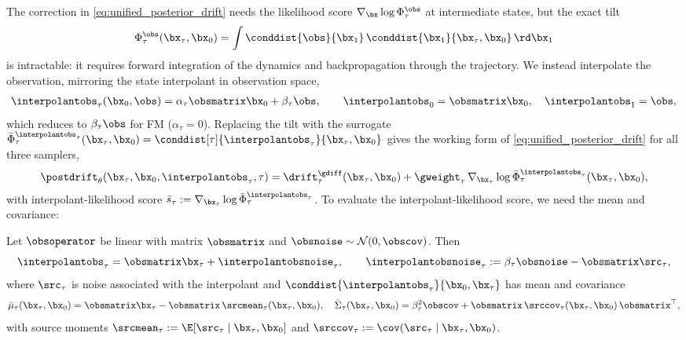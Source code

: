 The correction in \eqref{eq:unified_posterior_drift} needs the likelihood score $\nabla_{\bx}\log\Phi_\tau^{\obs}$ at intermediate states, but the exact tilt
\begin{align}\label{eq:phi_integral}
    \Phi_{\tau}^{\obs}(\bx_\tau, \bx_0)
    = \int \conddist{\obs}{\bx_1}\, \conddist{\bx_1}{\bx_\tau, \bx_0}\, \rd \bx_1
\end{align}
is intractable: it requires forward integration of the dynamics and backpropagation through the trajectory. We instead interpolate the observation, mirroring the state interpolant in observation space,
\begin{align} \label{eq:interpolated_observation}
    \interpolantobs_\tau(\bx_0, \obs) = \alpha_\tau \obsmatrix\bx_0 + \beta_\tau \obs,
    \qquad \interpolantobs_0 = \obsmatrix\bx_0,\quad \interpolantobs_1 = \obs,
\end{align}
which reduces to $\beta_\tau\obs$ for FM ($\alpha_\tau=0$). Replacing the tilt with the surrogate $\bar{\Phi}_{\tau}^{\interpolantobs_\tau}(\bx_\tau, \bx_0) = \conddist[\tau]{\interpolantobs_\tau}{\bx_\tau, \bx_0}$ gives the working form of \eqref{eq:unified_posterior_drift} for all three samplers,
\begin{align} \label{eq:interpolant_posterior_drift}
    \postdrift_\theta(\bx_{\tau}, \bx_0, \interpolantobs_\tau, \tau)
    =
    \drift^{\gdiff}_\tau(\bx_{\tau}, \bx_0)
    + \gweight_\tau\,
    \nabla_{\bx_\tau} \log\bar{\Phi}_{\tau}^{\interpolantobs_\tau}(\bx_\tau, \bx_0),
\end{align}
with interpolant-likelihood score $\bar s_\tau := \nabla_{\bx_\tau}\log\bar\Phi_\tau^{\interpolantobs_\tau}$. To evaluate the interpolant-likelihood score, we need the mean and covariance:
\begin{lemma}\label{lem:interpolated_likelihood}
Let $\obsoperator$ be linear with matrix $\obsmatrix$ and $\obsnoise \sim \mathcal{N}(0,\obscov)$. Then
\begin{equation}\label{eq:ybar_decomp}
  \interpolantobs_\tau = \obsmatrix\bx_\tau + \interpolantobsnoise_\tau,
  \qquad
  \interpolantobsnoise_\tau := \beta_\tau\obsnoise - \obsmatrix\src_\tau,
\end{equation}
where $\src_\tau$ is noise associated with the interpolant and $\conddist{\interpolantobs_\tau}{\bx_0, \bx_\tau}$ has mean and covariance
\begin{align}
  \bar{\mu}_\tau(\bx_\tau, \bx_0)
  = \obsmatrix\bx_\tau - \obsmatrix\,\srcmean_\tau(\bx_\tau,\bx_0),
     \quad %
  \bar{\Sigma}_{\tau}(\bx_\tau, \bx_0)
  = \beta_\tau^2\obscov + \obsmatrix\,\srccov_\tau(\bx_\tau,\bx_0)\,\obsmatrix^\top,
\end{align}
with source moments $\srcmean_\tau := \E[\src_\tau\mid\bx_\tau,\bx_0]$ and $\srccov_\tau := \cov(\src_\tau\mid\bx_\tau,\bx_0)$.
\end{lemma}
